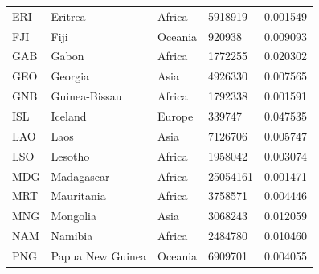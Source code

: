 \documentclass[11pt]{report}
\begin{document}
\begin{table}[h!]
\begin{tabular}{lllll}
            ERI                           & Eritrea                   & Africa                         & 5918919                       & 0.001549                           \\
            FJI                           & Fiji                      & Oceania                        & 920938                        & 0.009093                           \\
            GAB                           & Gabon                     & Africa                         & 1772255                       & 0.020302                           \\
            GEO                           & Georgia                   & Asia                           & 4926330                       & 0.007565                           \\
            GNB                           & Guinea-Bissau             & Africa                         & 1792338                       & 0.001591                           \\
            ISL                           & Iceland                   & Europe                         & 339747                        & 0.047535                           \\
            LAO                           & Laos                      & Asia                           & 7126706                       & 0.005747                           \\
            LSO                           & Lesotho                   & Africa                         & 1958042                       & 0.003074                           \\
            MDG                           & Madagascar                & Africa                         & 25054161                      & 0.001471                           \\
            MRT                           & Mauritania                & Africa                         & 3758571                       & 0.004446                           \\
            MNG                           & Mongolia                  & Asia                           & 3068243                       & 0.012059                           \\
            NAM                           & Namibia                   & Africa                         & 2484780                       & 0.010460                           \\
            PNG                           & Papua New Guinea          & Oceania                        & 6909701                       & 0.004055                           \\

\end{tabular}
\end{table}
\end{document}
